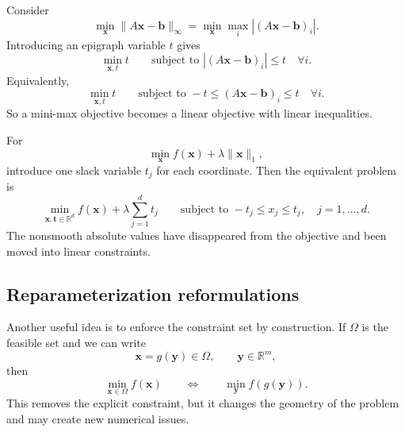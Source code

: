 \begin{example}
\label{ex:ch8-epigraph-inf}
Consider
\[
  \min_{\mathbf{x}} \|A\mathbf{x}-\mathbf{b}\|_\infty
  =
  \min_{\mathbf{x}} \max_i |(A\mathbf{x}-\mathbf{b})_i|.
\]
Introducing an epigraph variable $t$ gives
\[
  \min_{\mathbf{x},t} t
  \qquad
  \text{subject to }
  |(A\mathbf{x}-\mathbf{b})_i|\le t
  \quad \forall i.
\]
Equivalently,
\[
  \min_{\mathbf{x},t} t
  \qquad
  \text{subject to }
  -t \le (A\mathbf{x}-\mathbf{b})_i \le t
  \quad \forall i.
\]
So a mini-max objective becomes a linear objective with linear inequalities.
\end{example}

\begin{example}
\label{ex:ch8-epigraph-l1}
For
\[
  \min_{\mathbf{x}} f(\mathbf{x}) + \lambda \|\mathbf{x}\|_1,
\]
introduce one slack variable $t_j$ for each coordinate. Then the equivalent
problem is
\[
  \min_{\mathbf{x},\mathbf{t}\in \mathbb{R}^d}
  f(\mathbf{x}) + \lambda \sum_{j=1}^d t_j
  \qquad
  \text{subject to }
  -t_j \le x_j \le t_j,
  \quad j=1,\dots,d.
\]
The nonsmooth absolute values have disappeared from the objective and been
moved into linear constraints.
\end{example}

\subsection{Reparameterization reformulations}
\label{subsec:ch8-reparam}
Another useful idea is to enforce the constraint set by construction.
If $\Omega$ is the feasible set and we can write
\[
  \mathbf{x}=g(\mathbf{y})\in \Omega,
  \qquad
  \mathbf{y}\in \mathbb{R}^m,
\]
then
\[
  \min_{\mathbf{x}\in \Omega} f(\mathbf{x})
  \qquad \Longleftrightarrow \qquad
  \min_{\mathbf{y}} f(g(\mathbf{y})).
\]
This removes the explicit constraint, but it changes the geometry of the
problem and may create new numerical issues.

